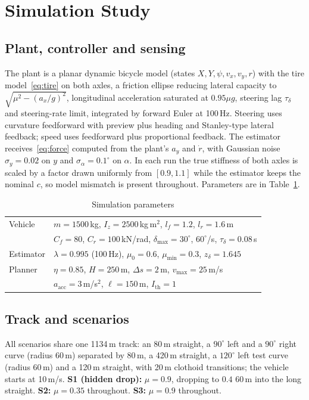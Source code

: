 \documentclass[letterpaper,journal,twoside]{IEEEtran}%
\begin{document}
\section{Simulation Study}
\subsection{Plant, controller and sensing}
The plant is a planar dynamic bicycle model (states $X,Y,\psi,v_x,v_y,r$) with the tire model~\eqref{eq:tire} on both axles, a friction ellipse reducing lateral capacity to $\sqrt{\mu^2-(a_x/g)^2}$, longitudinal acceleration saturated at $0.95\mu g$, steering lag $\tau_\delta$ and steering-rate limit, integrated by forward Euler at 100\,Hz. Steering uses curvature feedforward with preview plus heading and Stanley-type lateral feedback; speed uses feedforward plus proportional feedback. The estimator receives~\eqref{eq:force} computed from the plant's $a_y$ and $\dot r$, with Gaussian noise $\sigma_y=0.02$ on $y$ and $\sigma_\alpha=0.1^\circ$ on $\alpha$. In each run the true stiffness of both axles is scaled by a factor drawn uniformly from $[0.9,1.1]$ while the estimator keeps the nominal $c$, so model mismatch is present throughout. Parameters are in Table~\ref{tab:params}.

\begin{table}[t]
\centering\footnotesize
\caption{Simulation parameters}
\label{tab:params}
\setlength{\tabcolsep}{3pt}
\begin{tabular}{ll}
\toprule
Vehicle & $m=1500$\,kg, $I_z=2500$\,kg\,m$^2$, $l_f=1.2$, $l_r=1.6$\,m\\
 & $C_f=80$, $C_r=100$\,kN/rad, $\delta_{\max}=30^\circ$, $60^\circ$/s, $\tau_\delta=0.08$\,s\\
Estimator & $\lambda=0.995$ (100\,Hz), $\mu_0=0.6$, $\mu_{\min}=0.3$, $z_\delta=1.645$\\
Planner & $\eta=0.85$, $H=250$\,m, $\Delta s=2$\,m, $v_{\max}=25$\,m/s\\
 & $a_{\mathrm{acc}}=3$\,m/s$^2$, $\ell=150$\,m, $I_{\mathrm{th}}=1$\\
\bottomrule
\end{tabular}
\end{table}

\subsection{Track and scenarios}
All scenarios share one 1134\,m track: an 80\,m straight, a $90^\circ$ left and a $90^\circ$ right curve (radius 60\,m) separated by 80\,m, a 420\,m straight, a $120^\circ$ left test curve (radius 60\,m) and a 120\,m straight, with 20\,m clothoid transitions; the vehicle starts at 10\,m/s.
\textbf{S1 (hidden drop):} $\mu=0.9$, dropping to $0.4$ 60\,m into the long straight. \textbf{S2:} $\mu=0.35$ throughout. \textbf{S3:} $\mu=0.9$ throughout.
\end{document}
